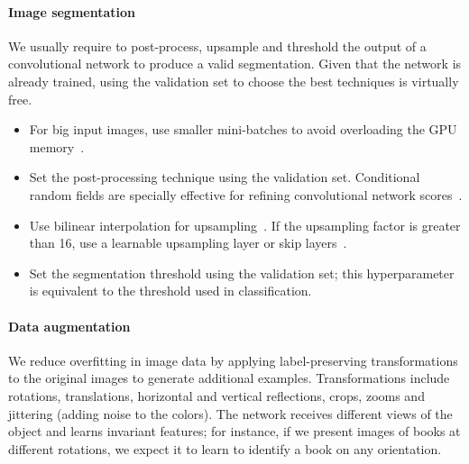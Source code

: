 \paragraph{Image segmentation} We usually require to post-process, upsample and threshold the output of a convolutional network to produce a valid segmentation. 
Given that the network is already trained, using the validation set to choose the best techniques is virtually free.%

\begin{itemize}

	\item For big input images, use smaller mini-batches to avoid overloading the GPU memory~\cite{Karpathy2016}.

	\item Set the post-processing technique using the validation set. Conditional random fields are specially effective for refining convolutional network scores~\cite{Chen2015}.

	\item Use bilinear interpolation for upsampling~\cite{Chen2015}. If the upsampling factor is greater than 16, use a learnable upsampling layer or skip layers~\cite{Long2015}.

	\item Set the segmentation threshold using the validation set; this hyperparameter is equivalent to the threshold used in classification.

\end{itemize}

\paragraph{Data augmentation} We reduce overfitting in image data by applying label-preserving transformations to the original images to generate additional examples. Transformations include rotations, translations, horizontal and vertical reflections, crops, zooms and jittering (adding noise to the colors).  The network receives different views of the object and learns invariant features; for instance, if we present images of books at different rotations, we expect it to learn to identify a book on any orientation.


